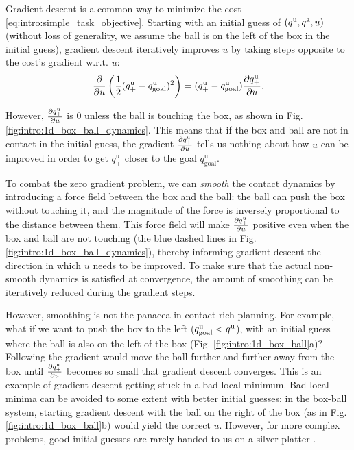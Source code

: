 Gradient descent is a common way to minimize the cost \eqref{eq:intro:simple_task_objective}. Starting with an initial guess of $({q^\mathrm{u}}, {q^\mathrm{a}}, u)$ (without loss of generality, we assume the ball is on the left of the box in the initial guess), gradient descent iteratively improves $u$ by taking steps opposite to the cost's gradient w.r.t. $u$:
\begin{equation}
\frac{\partial }{\partial u} \left(\frac{1}{2}(q^\mathrm{u}_+ - q^\mathrm{u}_\text{goal})^2\right)
= (q^\mathrm{u}_+ - q^\mathrm{u}_\text{goal}) \frac{\partial {q_+^\mathrm{u}}}{\partial {u}}.
\end{equation}

However, $\frac{\partial {q_+^\mathrm{u}}}{\partial {u}}$ is 0 unless the ball is touching the box, as shown in Fig. \ref{fig:intro:1d_box_ball_dynamics}. This means that if the box and ball are not in contact in the initial guess, the gradient $\frac{\partial {q_+^\mathrm{u}}}{\partial {u}}$ tells us nothing about how $u$ can be improved in order to get $q^\mathrm{u}_+$ closer to the goal $q^\mathrm{u}_\text{goal}$. 

To combat the zero gradient problem, we can \emph{smooth} the contact dynamics by introducing a force field between the box and the ball: the ball can push the box without touching it, and the magnitude of the force is inversely proportional to the distance between them. This force field will make $\frac{\partial {q_+^\mathrm{u}}}{\partial {u}}$ positive even when the box and ball are not touching (the blue dashed lines in Fig. \ref{fig:intro:1d_box_ball_dynamics}), thereby informing gradient descent the direction in which $u$ needs to be improved. To make sure that the actual non-smooth dynamics is satisfied at convergence, the amount of smoothing can be iteratively reduced during the gradient steps.

However, smoothing is not the panacea in contact-rich planning. For example, what if we want to push the box to the left ($q^\mathrm{u}_\text{goal} < {q^\mathrm{u}}$), with an initial guess where the ball is also on the left of the box (Fig. \ref{fig:intro:1d_box_ball}a)? Following the gradient would move the ball further and further away from the box until $\frac{\partial {q_+^\mathrm{u}}}{\partial {u}}$ becomes so small that gradient descent converges. This is an example of gradient descent getting stuck in a bad local minimum. Bad local minima can be avoided to some extent with better initial guesses: in the box-ball system, starting gradient descent with the ball on the right of the box (as in Fig. \ref{fig:intro:1d_box_ball}b) would yield the correct $u$. However, for more complex problems, good initial guesses are rarely handed to us on a silver platter \cite{onol2020tuning }.

